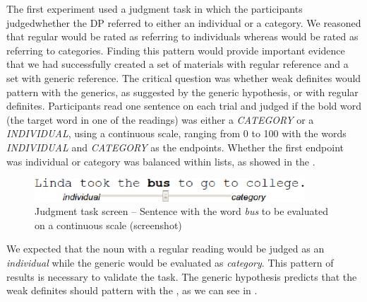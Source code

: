 \documentclass[output=paper,
modfonts
]{langscibook}
\begin{document}
The first experiment used a judgment task in which the participants judged\linebreak whether the DP referred to either an individual or a category. We reasoned that regular  would be rated as referring to individuals whereas  would be rated as referring to categories. Finding this pattern would provide important evidence that we had successfully created a set of materials with regular reference and a set with generic reference. The critical question was whether weak definites would pattern with the generics, as suggested by the generic hypothesis, or with regular definites. Participants read one sentence on each trial and judged if the bold word (the target word in one of the readings) was either a \textit{CATEGORY} or a \textit{INDIVIDUAL}, using a continuous scale, ranging from 0 to 100 with the words \textit{INDIVIDUAL} and \textit{CATEGORY} as the endpoints. Whether the first endpoint was individual or category was balanced within lists, as showed in the .

\begin{figure}[H]
\centering
\includegraphics[width=0.9\textwidth]{figures/fig_jpinput}
\caption{Judgment task screen -- Sentence with the word \textit{bus} to be evaluated on a continuous scale (screenshot)}
\label{fig:desaetal:3}
\end{figure}

We expected that the noun with a regular reading would be judged as an \textit{individual} while the generic would be evaluated as \textit{category}. This pattern of results is necessary to validate the task. The generic hypothesis predicts that the weak definites should pattern with the , as we can see in .
\end{document}
